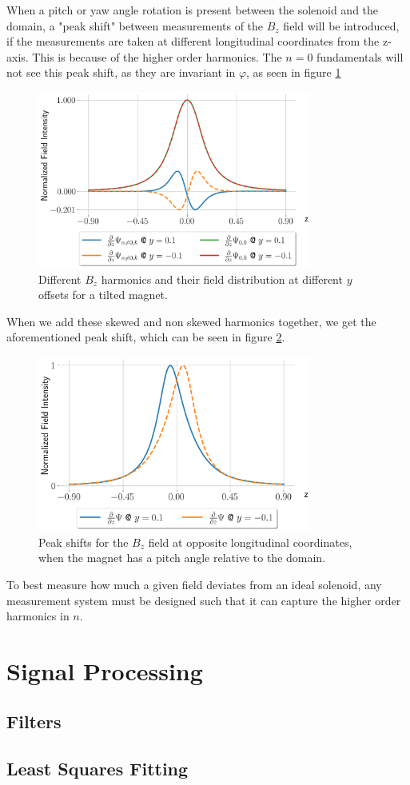 When a pitch or yaw angle rotation is present between the solenoid and 
the domain, a "peak shift" between measurements of the $B_z$
field will be introduced, if the measurements are taken at
different longitudinal coordinates from the z-axis.
This is because of the higher order harmonics. The $n=0$ fundamentals will
not see this peak shift, as they are invariant in $\varphi$,
as seen in figure \ref{fig:harmonicsskew}
\begin{figure}[!h]
    \centering
    \includegraphics[width=0.8\textwidth]{figs/harmonicsskew.png}
    \caption{Different $B_z$ harmonics and their field distribution at
    different $y$ offsets for a tilted magnet.}
    \label{fig:harmonicsskew}
\end{figure}

When we add these skewed and non skewed harmonics together, we get the 
aforementioned peak shift, which can be seen in figure \ref{fig:mirrored}.

\begin{figure}[!h]
    \centering
    \includegraphics[width=0.8\textwidth]{figs/mirrored}
    \caption{Peak shifts for the $B_z$ field at opposite longitudinal
    coordinates, when the magnet has a pitch angle relative
    to the domain.}
    \label{fig:mirrored}
\end{figure}

To best measure how much a given field deviates from an ideal solenoid,
any measurement system must be designed such that it can capture the
higher order harmonics in $n$. 

\newpage
\section{Signal Processing}
\subsection{Filters}
\subsection{Least Squares Fitting}